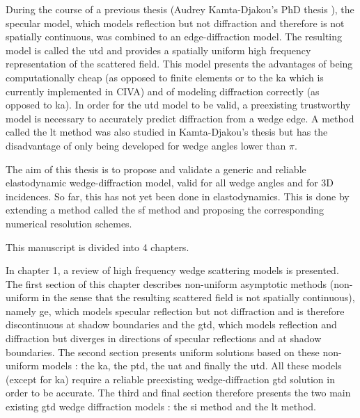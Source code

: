During the course of a previous thesis (Audrey Kamta-Djakou's PhD thesis \cite{AKDthese}), the specular model, which models reflection but not diffraction and therefore is not spatially continuous, was combined to an edge-diffraction model. The resulting model is called the \acrfull{utd} and provides a spatially uniform high frequency representation of the scattered field. This model presents the advantages of being computationally cheap (as opposed to finite elements or to the \acrfull{ka} which is currently implemented in CIVA) and of modeling diffraction correctly (as opposed to \acrshort{ka}). In order for the \acrshort{utd} model to be valid, a preexisting trustworthy model is necessary to accurately predict diffraction from a wedge edge. A method called the \acrfull{lt} method \cite{GautesenFradkin} was also studied in Kamta-Djakou's thesis but has the disadvantage of only being developed for wedge angles lower than $\pi$.

The aim of this thesis is to propose and validate a generic and reliable elastodynamic wedge-diffraction model, valid for all wedge angles and for 3D incidences. So far, this has not yet been done in elastodynamics. This is done by extending a method called the \acrfull{sf} method and proposing the corresponding numerical resolution schemes. 

This manuscript is divided into 4 chapters.

In chapter 1, a review of high frequency wedge scattering models is presented. The first section of this chapter describes non-uniform asymptotic methods (non-uniform in the sense that the resulting scattered field is not spatially continuous), namely \acrfull{ge}, which models specular reflection but not diffraction and is therefore discontinuous at shadow boundaries and the \acrfull{gtd}, which models reflection and diffraction but diverges in directions of specular reflections and at shadow boundaries. The second section presents uniform solutions based on these non-uniform models : the \acrfull{ka}, the \acrfull{ptd}, the \acrfull{uat} and finally the \acrfull{utd}. All these models (except for \acrshort{ka}) require a reliable preexisting wedge-diffraction \acrshort{gtd} solution in order to be accurate. The third and final section therefore presents the two main existing \acrshort{gtd} wedge diffraction models : the \acrfull{si} method and the \acrfull{lt} method.


